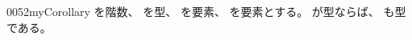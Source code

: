 \documentclass[index]{subfiles}
\begin{document}
\begin{myBlock}{0052}{myCorollary}
  を階数、
  を型、
  を要素、
  を要素とする。
  が型ならば、
  も型である。 \myQed
\end{myBlock}
\end{document}
